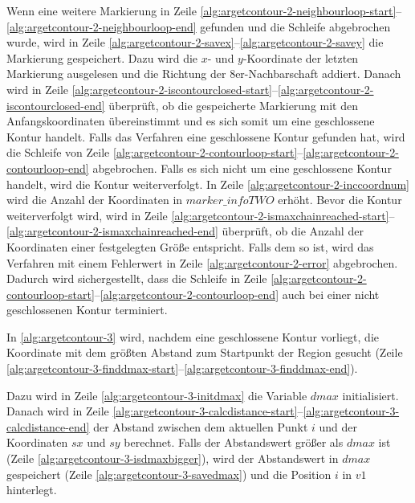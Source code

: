 Wenn eine weitere Markierung in Zeile
 \ref{alg:argetcontour-2-neighbourloop-start}--\ref{alg:argetcontour-2-neighbourloop-end} gefunden und die Schleife
 abgebrochen wurde, wird in Zeile \ref{alg:argetcontour-2-savex}--\ref{alg:argetcontour-2-savey} die Markierung
 gespeichert. Dazu wird die $x$- und $y$-Koordinate der letzten Markierung ausgelesen und die Richtung der
 8er-Nachbarschaft addiert. Danach wird in Zeile
 \ref{alg:argetcontour-2-iscontourclosed-start}--\ref{alg:argetcontour-2-iscontourclosed-end} überprüft, ob die
 gespeicherte Markierung mit den Anfangskoordinaten übereinstimmt und es sich somit um eine geschlossene Kontur
 handelt. Falls das Verfahren eine geschlossene Kontur gefunden hat, wird die Schleife von Zeile
 \ref{alg:argetcontour-2-contourloop-start}--\ref{alg:argetcontour-2-contourloop-end} abgebrochen. Falls es sich nicht
 um eine geschlossene Kontur handelt, wird die Kontur weiterverfolgt. In Zeile \ref{alg:argetcontour-2-inccoordnum}
 wird die Anzahl der Koordinaten in $\mathit{marker\_infoTWO}$ erhöht. Bevor die Kontur weiterverfolgt wird, wird in
 Zeile \ref{alg:argetcontour-2-ismaxchainreached-start}--\ref{alg:argetcontour-2-ismaxchainreached-end} überprüft, ob
 die Anzahl der Koordinaten einer festgelegten Größe entspricht. Falls dem so ist, wird das Verfahren mit einem
 Fehlerwert in Zeile \ref{alg:argetcontour-2-error} abgebrochen. Dadurch wird sichergestellt, dass die Schleife in
 Zeile \ref{alg:argetcontour-2-contourloop-start}--\ref{alg:argetcontour-2-contourloop-end} auch bei einer nicht
 geschlossenen Kontur terminiert.

In \autoref{alg:argetcontour-3} wird, nachdem eine geschlossene Kontur vorliegt, die Koordinate mit dem größten Abstand
 zum Startpunkt der Region gesucht (Zeile
 \ref{alg:argetcontour-3-finddmax-start}--\ref{alg:argetcontour-3-finddmax-end}).



Dazu wird in Zeile \ref{alg:argetcontour-3-initdmax} die Variable $\mathit{dmax}$ initialisiert. Danach wird in Zeile
 \ref{alg:argetcontour-3-calcdistance-start}--\ref{alg:argetcontour-3-calcdistance-end} der Abstand zwischen dem
 aktuellen Punkt $i$ und der Koordinaten $\mathit{sx}$ und $\mathit{sy}$ berechnet. Falls der Abstandswert größer als
 $\mathit{dmax}$ ist (Zeile \ref{alg:argetcontour-3-isdmaxbigger}), wird der Abstandswert in $\mathit{dmax}$
 gespeichert (Zeile \ref{alg:argetcontour-3-savedmax}) und die Position $i$ in $\mathit{v1}$ hinterlegt.

